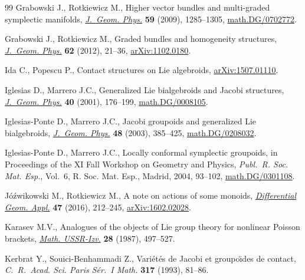 \documentclass[pdftex]{sigma}
\numberwithin{equation}{section}
\begin{document}
\begin{thebibliography}{99}
Grabowski J., Rotkiewicz M., Higher vector bundles and multi-graded symplectic
 manifolds, \href{https://doi.org/10.1016/j.geomphys.2009.06.009}{\textit{J.~Geom. Phys.}} \textbf{59} (2009), 1285--1305,
 \href{https://arxiv.org/abs/math.DG/0702772}{math.DG/0702772}.

Grabowski J., Rotkiewicz M., Graded bundles and homogeneity structures,
 \href{https://doi.org/10.1016/j.geomphys.2011.09.004}{\textit{J.~Geom. Phys.}} \textbf{62} (2012), 21--36, \href{https://arxiv.org/abs/1102.0180}{arXiv:1102.0180}.

Ida C., Popescu P., Contact structures on Lie algebroids, \href{https://arxiv.org/abs/1507.01110}{arXiv:1507.01110}.

Iglesias D., Marrero J.C., Generalized {L}ie bialgebroids and {J}acobi
 structures, \href{https://doi.org/10.1016/S0393-0440(01)00032-8}{\textit{J.~Geom. Phys.}} \textbf{40} (2001), 176--199,
 \href{https://arxiv.org/abs/math.DG/0008105}{math.DG/0008105}.

Iglesias-Ponte D., Marrero J.C., Jacobi groupoids and generalized {L}ie
 bialgebroids, \href{https://doi.org/10.1016/S0393-0440(03)00050-0}{\textit{J.~Geom. Phys.}} \textbf{48} (2003), 385--425,
 \href{https://arxiv.org/abs/math.DG/0208032}{math.DG/0208032}.

Iglesias-Ponte D., Marrero J.C., Locally conformal symplectic groupoids, in
 Proceedings of the {XI} {F}all {W}orkshop on {G}eometry and {P}hysics,
 \textit{Publ.~R. Soc. Mat. Esp.}, Vol.~6, R. Soc. Mat. Esp., Madrid, 2004,
 93--102, \href{https://arxiv.org/abs/math.DG/0301108}{math.DG/0301108}.

J\'o\'zwikowski M., Rotkiewicz M., A note on actions of some monoids,
 \href{https://doi.org/10.1016/j.difgeo.2016.04.003}{\textit{Differential Geom. Appl.}} \textbf{47} (2016), 212--245,
 \href{https://arxiv.org/abs/1602.02028}{arXiv:1602.02028}.

Karasev M.V., Analogues of the objects of Lie group theory for nonlinear
 {P}oisson brackets, \href{https://doi.org/10.1070/IM1987v028n03ABEH000895}{\textit{Math. USSR-Izv.}} \textbf{28} (1987), 497--527.

Kerbrat Y., Souici-Benhammadi Z., Vari\'et\'es de {J}acobi et groupo\"\i des de
 contact, \textit{C.~R.~Acad. Sci. Paris S\'er.~I Math.} \textbf{317} (1993),
 81--86.


\end{thebibliography}
\end{document}
